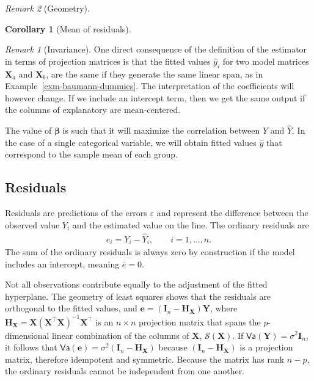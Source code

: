 \documentclass[
  11pt,
  letterpaper,
]{scrbook}
\theoremstyle{definition}
\theoremstyle{definition}
\theoremstyle{plain}
\theoremstyle{plain}
\newtheorem{corollary}{Corollary}[chapter]
\theoremstyle{remark}
\newtheorem{refremark}{Remark}[chapter]
\begin{document}
\begin{refremark}[Geometry]
\begin{corollary}[Mean of
residuals]
\end{corollary}

\begin{refremark}[Invariance]
One direct consequence of the definition of the estimator in terms of
projection matrices is that the fitted values \(\widehat{y}_i\) for two
model matrices \(\mathbf{X}_a\) and \(\mathbf{X}_b\), are the same if
they generate the same linear span, as in
Example~\ref{exm-baumann-dummies}. The interpretation of the
coefficients will however change. If we include an intercept term, then
we get the same output if the columns of explanatory are mean-centered.

\label{rem-invariance}

\end{refremark}

The value of \(\boldsymbol{\beta}\) is such that it will maximize the
correlation between \(Y\) and \(\widehat{Y}\). In the case of a single
categorical variable, we will obtain fitted values \(\widehat{y}\) that
correspond to the sample mean of each group.

\label{rem-geometry}

\end{refremark}

\subsection{Residuals}\label{residuals}

Residuals are predictions of the errors \(\varepsilon\) and represent
the difference between the observed value \(Y_i\) and the estimated
value on the line. The ordinary residuals are \begin{align*}
e_i=Y_i-\widehat{Y}_i, \qquad i =1, \ldots, n.
\end{align*} The sum of the ordinary residuals is always zero by
construction if the model includes an intercept, meaning
\(\overline{e} = 0\).

Not all observations contribute equally to the adjustment of the fitted
hyperplane. The geometry of least squares shows that the residuals are
orthogonal to the fitted values, and
\(\boldsymbol{e} = (\mathbf{I}_n-\mathbf{H}_{\mathbf{X}})\boldsymbol{Y}\),
where
\(\mathbf{H}_{\mathbf{X}}=\mathbf{X}(\mathbf{X}^\top\mathbf{X})^{-1}\mathbf{X}^\top\)
is an \(n \times n\) projection matrix that spans the \(p\)-dimensional
linear combination of the columns of \(\mathbf{X}\),
\(\mathscr{S}(\mathbf{X})\). If
\(\mathsf{Va}(\boldsymbol{Y}) = \sigma^2\mathbf{I}_n\), it follows that
\(\mathsf{Va}(\boldsymbol{e})=\sigma^2(\mathbf{I}_n-\mathbf{H}_{\mathbf{X}})\)
because \((\mathbf{I}_n-\mathbf{H}_{\mathbf{X}})\) is a projection
matrix, therefore idempotent and symmetric. Because the matrix has rank
\(n-p\), the ordinary residuals cannot be independent from one another.
\end{document}

